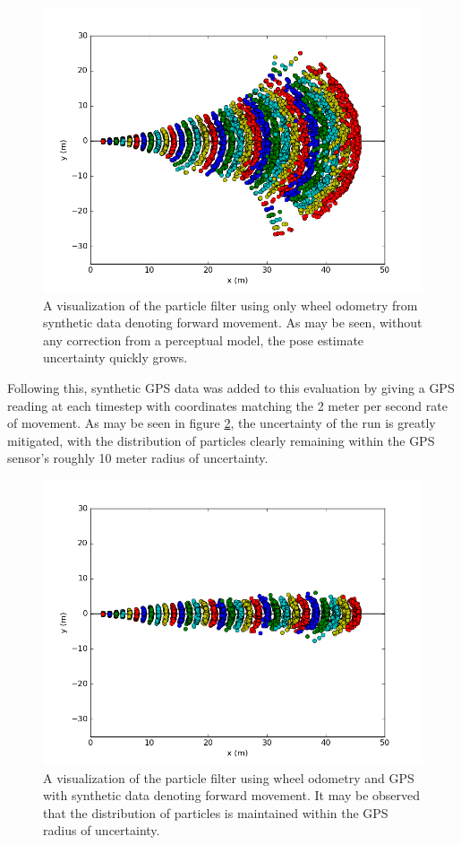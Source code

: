 \documentclass[letterpaper, 12 pt, conference]{ieeeconf}  %
\begin{document}
\begin{figure}[h]
\centering
\includegraphics[scale=01.0]{NO_GPS}
\caption{A visualization of the particle filter using only wheel odometry from synthetic data denoting forward movement. As may be seen, without any correction from a perceptual model, the pose estimate uncertainty quickly grows.}
\label{odometry_error}
\end{figure}

Following this, synthetic GPS data was added to this evaluation by giving a GPS reading at each timestep with coordinates matching the 2 meter per second rate of movement. As may be seen in figure \ref{with_gps}, the uncertainty of the run is greatly mitigated, with the distribution of particles clearly remaining within the GPS sensor's roughly 10 meter radius of uncertainty. 

\begin{figure}[h]
\centering
\includegraphics[scale=.9]{With_GPS}
\caption{A visualization of the particle filter using wheel odometry and GPS with synthetic data denoting forward movement. It may be observed that the distribution of particles is maintained within the GPS radius of uncertainty. }
\label{with_gps}
\end{figure}
\end{document}
